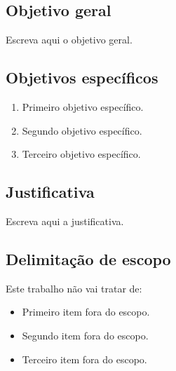 \documentclass[12pt,a4paper]{article}
\begin{document}
\subsection{Objetivo geral}

Escreva aqui o objetivo geral.

\subsection{Objetivos específicos}
%
%

\begin{enumerate}
  \item Primeiro objetivo específico.
  \item Segundo objetivo específico.
  \item Terceiro objetivo específico.
\end{enumerate}

\subsection{Justificativa}
%
%

Escreva aqui a justificativa.

\subsection{Delimitação de escopo}

Este trabalho não vai tratar de:

\begin{itemize}
  \item Primeiro item fora do escopo.
  \item Segundo item fora do escopo.
  \item Terceiro item fora do escopo.
\end{itemize}
\end{document}

